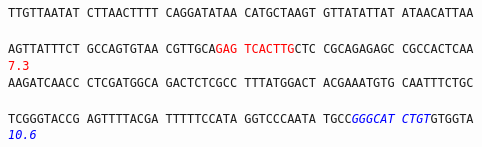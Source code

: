 \documentclass[11pt,twoside,reqno,a4paper]{article}
\begin{document}
\texttt{TTGTTAATAT	CTTAACTTTT	CAGGATATAA	CATGCTAAGT	GTTATATTAT	ATAACATTAA	\\
\hspace*{1\charwidth}\hspace*{1\charwidth}\hspace*{1\charwidth}\hspace*{1\charwidth}\hspace*{1\charwidth}\hspace*{1\charwidth}\\
AGTTATTTCT	GCCAGTGTAA	CGTTGCA\textcolor{Red}{G}\textcolor{Red}{A}\textcolor{Red}{G}	\textcolor{Red}{T}\textcolor{Red}{C}\textcolor{Red}{A}\textcolor{Red}{C}\textcolor{Red}{T}\textcolor{Red}{T}\textcolor{Red}{G}CTC	CGCAGAGAGC	CGCCACTCAA	\\
\hspace*{1\charwidth}\hspace*{1\charwidth}\hspace*{27\charwidth}\textcolor{Red}{7.3}\hspace*{1\charwidth}\hspace*{1\charwidth}\hspace*{1\charwidth}\\
AAGATCAACC	CTCGATGGCA	GACTCTCGCC	TTTATGGACT	ACGAAATGTG	CAATTTCTGC	\\
\hspace*{1\charwidth}\hspace*{1\charwidth}\hspace*{1\charwidth}\hspace*{1\charwidth}\hspace*{1\charwidth}\hspace*{1\charwidth}\\
TCGGGTACCG	AGTTTTACGA	TTTTTCCATA	GGTCCCAATA	TGCC\textit{\textcolor{Blue}{G}}\textit{\textcolor{Blue}{G}}\textit{\textcolor{Blue}{G}}\textit{\textcolor{Blue}{C}}\textit{\textcolor{Blue}{A}}\textit{\textcolor{Blue}{T}}	\textit{\textcolor{Blue}{C}}\textit{\textcolor{Blue}{T}}\textit{\textcolor{Blue}{G}}\textit{\textcolor{Blue}{T}}GTGGTA	\\
\hspace*{1\charwidth}\hspace*{1\charwidth}\hspace*{1\charwidth}\hspace*{1\charwidth}\hspace*{44\charwidth}\textit{\textcolor{Blue}{10.6}}\hspace*{1\charwidth}\hspace*{1\charwidth}\\
}
\end{document}
